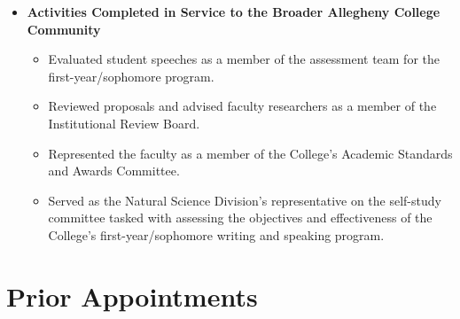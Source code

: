 \documentclass[11pt,letterpaper,sans]{moderncv}
\begin{document}
{\begin{itemize}
\begin{itemize}
          used in real-world learning environments.
        \item Served as both an academic and research adviser for both graduate
          and undergraduate students.
      \end{itemize}
    \item \textbf{Activities Completed in Service to the Broader Allegheny
      College Community}
      \begin{itemize} \renewcommand\labelitemi{\Large\textbullet}
        \item Evaluated student speeches as a member of the assessment team for
          the first-year/sophomore program.
        \item Reviewed proposals and advised faculty researchers as a member of
          the Institutional Review Board.
        \item Represented the faculty as a member of the College's Academic
          Standards and Awards Committee.
        \item Served as the Natural Science Division's representative on the
          self-study committee tasked with assessing the objectives and
          effectiveness of the College's first-year/sophomore writing and
          speaking program.
      \end{itemize}
  \end{itemize}
}

%
\vspace*{-.1in}
%
\section{Prior Appointments}

%

%

%
\end{document}
